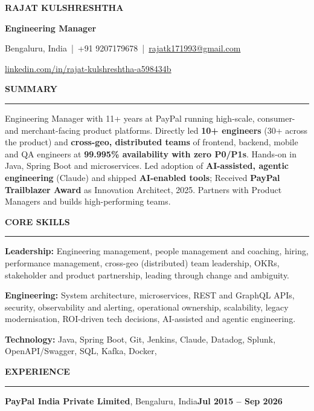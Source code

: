 \documentclass[10pt,a4paper]{article}
\renewcommand{\normalsize}{\fontsize{9.4}{10.7}\selectfont}
\newcommand{\bd}[1]{\textbf{#1}}
\newcommand{\sect}[1]{%
  \par\vspace{4pt}%
  {\bfseries\fontsize{10}{11.5}\selectfont #1}\par\nointerlineskip
  \vspace{1pt}\noindent\rule{\linewidth}{0.6pt}\par\vspace{2.5pt}}
\newcommand{\company}[3]{%
  \par\vspace{2pt}\noindent\textbf{#1}, #2\hfill\textbf{#3}\par\nopagebreak}
\begin{document}
\normalsize

\centerline{\bfseries\fontsize{15}{17}\selectfont RAJAT KULSHRESHTHA}
\vspace{1pt}
\centerline{\bfseries\fontsize{10.5}{12}\selectfont Engineering Manager}
\vspace{2pt}
\centerline{Bengaluru, India \,|\, +91 9207179678 \,|\,
  \href{mailto:rajatk171993@gmail.com}{rajatk171993@gmail.com}}
\vspace{1pt}
\centerline{\href{https://www.linkedin.com/in/rajat-kulshreshtha-a598434b/}{linkedin.com/in/rajat-kulshreshtha-a598434b}}

\sect{SUMMARY}
Engineering Manager with 11+ years at PayPal running high-scale, consumer- and merchant-facing
product platforms. Directly led \bd{10+ engineers} (30+ across the product) and \bd{cross-geo,
distributed teams} of frontend, backend, mobile and QA engineers at \bd{99.995\% availability with
zero P0/P1s}. Hands-on in Java, Spring Boot and microservices. Led adoption of \bd{AI-assisted,
agentic engineering} (Claude) and shipped \bd{AI-enabled tools}; Received \bd{PayPal Trailblazer Award}
as Innovation Architect, 2025. Partners with Product Managers and builds high-performing teams.

\sect{CORE SKILLS}
\textbf{Leadership:} Engineering management, people management and coaching, hiring,
performance management, cross-geo (distributed) team leadership, OKRs, stakeholder
and product partnership, leading through change and ambiguity.\par
\textbf{Engineering:} System architecture, microservices, REST and GraphQL APIs, security,
observability and alerting, operational ownership, scalability, legacy
modernisation, ROI-driven tech decisions, AI-assisted and agentic engineering.\par
\textbf{Technology:} Java, Spring Boot, Git, Jenkins, Claude, Datadog,
Splunk, OpenAPI/Swagger, SQL, Kafka, Docker,

\sect{EXPERIENCE}
\company{PayPal India Private Limited}{Bengaluru, India}{Jul 2015 -- Sep 2026}
\end{document}
